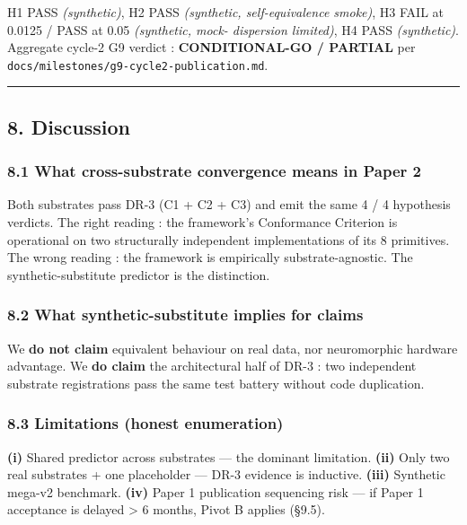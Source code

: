 \documentclass[
]{article}
\begin{document}
H1 PASS \emph{(synthetic)}, H2 PASS \emph{(synthetic, self-equivalence
smoke)}, H3 FAIL at 0.0125 / PASS at 0.05 \emph{(synthetic, mock-
dispersion limited)}, H4 PASS \emph{(synthetic)}. Aggregate cycle-2 G9
verdict : \textbf{CONDITIONAL-GO / PARTIAL} per
\texttt{docs/milestones/g9-cycle2-publication.md}.

\begin{center}\rule{0.5\linewidth}{0.5pt}\end{center}

\subsection{8. Discussion}\label{discussion}

\subsubsection{8.1 What cross-substrate convergence means in Paper
2}\label{what-cross-substrate-convergence-means-in-paper-2}

Both substrates pass DR-3 (C1 + C2 + C3) and emit the same 4 / 4
hypothesis verdicts. The right reading : the framework's Conformance
Criterion is operational on two structurally independent implementations
of its 8 primitives. The wrong reading : the framework is empirically
substrate-agnostic. The synthetic-substitute predictor is the
distinction.

\subsubsection{8.2 What synthetic-substitute implies for
claims}\label{what-synthetic-substitute-implies-for-claims}

We \textbf{do not claim} equivalent behaviour on real data, nor
neuromorphic hardware advantage. We \textbf{do claim} the architectural
half of DR-3 : two independent substrate registrations pass the same
test battery without code duplication.

\subsubsection{8.3 Limitations (honest
enumeration)}\label{limitations-honest-enumeration}

\textbf{(i)} Shared predictor across substrates --- the dominant
limitation. \textbf{(ii)} Only two real substrates + one placeholder ---
DR-3 evidence is inductive. \textbf{(iii)} Synthetic mega-v2 benchmark.
\textbf{(iv)} Paper 1 publication sequencing risk --- if Paper 1
acceptance is delayed \textgreater{} 6 months, Pivot B applies (§9.5).
\end{document}
